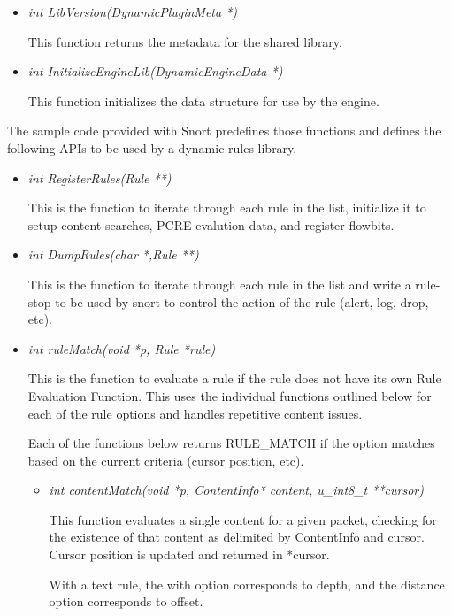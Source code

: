 \documentclass[english]{report}
\begin{document}
\begin{itemize}
\item {\em int LibVersion(DynamicPluginMeta *)}

This function returns the metadata for the shared library.

\item {\em int InitializeEngineLib(DynamicEngineData *)}

This function initializes the data structure for use by the engine.
\end{itemize}

The sample code provided with Snort predefines those functions 
and defines the following APIs to be used by a dynamic rules
library.

\begin{itemize}
\item {\em int RegisterRules(Rule **)}

This is the function to iterate through each rule in the list,
initialize it to setup content searches, PCRE evalution data,
and register flowbits.

\item {\em int DumpRules(char *,Rule **)}

This is the function to iterate through each rule in the list and
write a rule-stop to be used by snort to control the action of the
rule (alert, log, drop, etc).

\item {\em int ruleMatch(void *p, Rule *rule)}

This is the function to evaluate a rule if the rule does not have
its own Rule Evaluation Function.  This uses the individual
functions outlined below for each of the rule options and handles
repetitive content issues.  

Each of the functions below returns RULE\_MATCH if the option
matches based on the current criteria (cursor position, etc).

\begin{itemize}

\item {\em int contentMatch(void *p, ContentInfo* content, u\_int8\_t **cursor)}

This function evaluates a single content for a given packet, checking
for the existence of that content as delimited by ContentInfo and
cursor.  Cursor position is updated and returned in *cursor.

With a text rule, the with option corresponds to depth, and the
distance option corresponds to offset.


\end{itemize}
\end{itemize}
\end{document}
